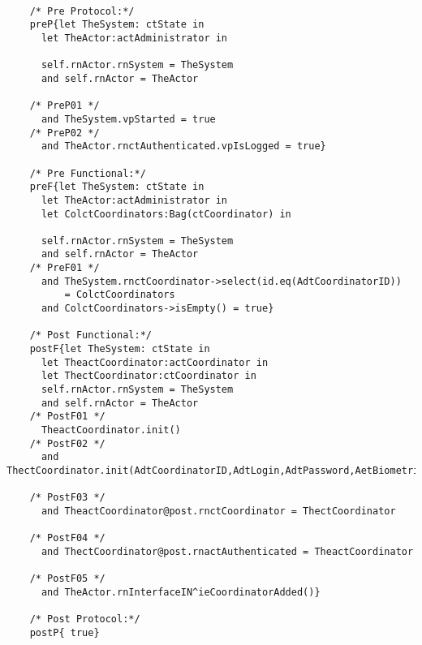 	\scriptsize
	\vspace{0.5cm}
	\begin{lstlisting}[style=MessirStyle,firstnumber=auto,captionpos=b,caption={\msrmessir (MCL-oriented) specification of the operation \emph{oeAddCoordinator}.},label=OM-actAdministrator-oeAddCoordinator-MCL-LST]

	/* Pre Protocol:*/ 
	preP{let TheSystem: ctState in
	  let TheActor:actAdministrator in
	  
	  self.rnActor.rnSystem = TheSystem
	  and self.rnActor = TheActor
	  
	/* PreP01 */
	  and TheSystem.vpStarted = true
	/* PreP02 */
	  and TheActor.rnctAuthenticated.vpIsLogged = true}
	
	/* Pre Functional:*/
	preF{let TheSystem: ctState in
	  let TheActor:actAdministrator in
	  let ColctCoordinators:Bag(ctCoordinator) in
	  
	  self.rnActor.rnSystem = TheSystem
	  and self.rnActor = TheActor
	/* PreF01 */
	  and TheSystem.rnctCoordinator->select(id.eq(AdtCoordinatorID))
	      = ColctCoordinators
	  and ColctCoordinators->isEmpty() = true}
	
	/* Post Functional:*/ 
	postF{let TheSystem: ctState in
	  let TheactCoordinator:actCoordinator in
	  let ThectCoordinator:ctCoordinator in
	  self.rnActor.rnSystem = TheSystem
	  and self.rnActor = TheActor
	/* PostF01 */
	  TheactCoordinator.init()
	/* PostF02 */
	  and ThectCoordinator.init(AdtCoordinatorID,AdtLogin,AdtPassword,AetBiometricAuthType,AdtBiometrics)
	
	/* PostF03 */
	  and TheactCoordinator@post.rnctCoordinator = ThectCoordinator
	  
	/* PostF04 */  
	  and ThectCoordinator@post.rnactAuthenticated = TheactCoordinator
	   
	/* PostF05 */  
	  and TheActor.rnInterfaceIN^ieCoordinatorAdded()}
	
	/* Post Protocol:*/ 
	postP{ true}
	
	\end{lstlisting}
	\normalsize 
	
	
	
	





